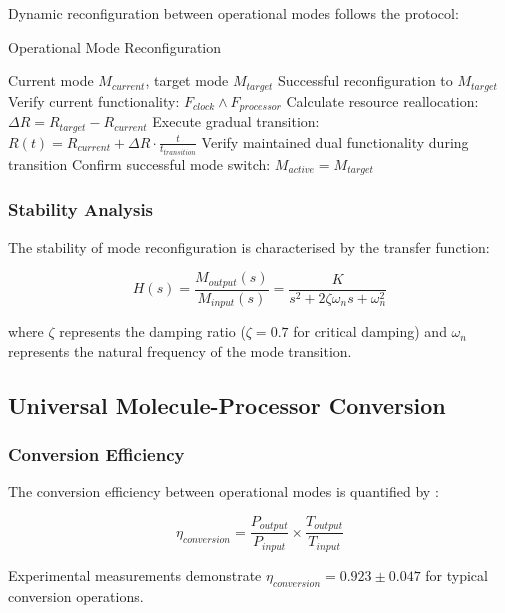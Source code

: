 \documentclass[12pt,a4paper]{article}
\begin{document}
Dynamic reconfiguration between operational modes follows the protocol:

\begin{algorithm}[H]
\caption{Operational Mode Reconfiguration}
\begin{algorithmic}[1]
\REQUIRE Current mode $M_{current}$, target mode $M_{target}$
\ENSURE Successful reconfiguration to $M_{target}$
\STATE Verify current functionality: $F_{clock} \land F_{processor}$
\STATE Calculate resource reallocation: $\Delta R = R_{target} - R_{current}$
\STATE Execute gradual transition: $R(t) = R_{current} + \Delta R \cdot \frac{t}{t_{transition}}$
\STATE Verify maintained dual functionality during transition
\STATE Confirm successful mode switch: $M_{active} = M_{target}$
\end{algorithmic}
\end{algorithm}

\subsubsection{Stability Analysis}

The stability of mode reconfiguration is characterised by the transfer function:

\begin{equation}
H(s) = \frac{M_{output}(s)}{M_{input}(s)} = \frac{K}{s^2 + 2\zeta\omega_n s + \omega_n^2}
\end{equation}

where $\zeta$ represents the damping ratio ($\zeta = 0.7$ for critical damping) and $\omega_n$ represents the natural frequency of the mode transition.

\subsection{Universal Molecule-Processor Conversion}

\subsubsection{Conversion Efficiency}

The conversion efficiency between operational modes is quantified by \cite{bennett1982thermodynamics}:

\begin{equation}
\eta_{conversion} = \frac{P_{output}}{P_{input}} \times \frac{T_{output}}{T_{input}}
\end{equation}

Experimental measurements demonstrate $\eta_{conversion} = 0.923 \pm 0.047$ for typical conversion operations.
\end{document}
